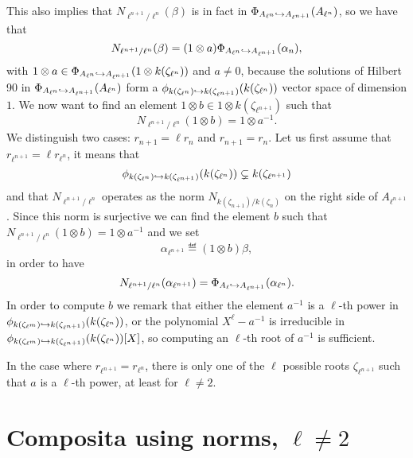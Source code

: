 \documentclass[a4paper,11pt]{article}
\begin{document}
This also implies that $N_{\ell^{n+1}/\ell^n}(\beta)$ is in fact in
$\Phi_{A_{\ell^n}\hookrightarrow A_{\ell^{n+1}}}(A_{\ell^n})$, so we have that
\[
  N_{\ell^{n+1}/\ell^n}(\beta) = (1\otimes a)\Phi_{A_{\ell^n}\hookrightarrow
  A_{\ell^{n+1}}}(\alpha_n),
\]
with $1\otimes a\in \Phi_{A_{\ell^n}\hookrightarrow A_{\ell^{n+1}}}(1\otimes
k(\zeta_{\ell^n}))$ and $a\neq0$, because the solutions of Hilbert 90 in
$\Phi_{A_{\ell^n}\hookrightarrow A_{\ell^{n+1}}}(A_{\ell^n})$
form a $\phi_{k(\zeta_{\ell^n})\hookrightarrow k(\zeta_{\ell^{n+1}})}(k(\zeta_{\ell^n}))$ vector space of dimension $1$. We now want to find an
element $1\otimes b\in1\otimes k(\zeta_{\ell^{n+1}})$ such that
\[
N_{\ell^{n+1}/\ell^n}(1\otimes b)=1\otimes a^{-1}.
\]
We distinguish two
cases: $r_{n+1}=\ell r_n$ and $r_{n+1}=r_n$.
Let us first assume that $r_{\ell^{n+1}}=\ell r_{\ell^n}$, it means that
\[
  \phi_{k(\zeta_{\ell^n})\hookrightarrow k(\zeta_{\ell^{n+1}})}(k(\zeta_{\ell^n}))\subsetneq
k(\zeta_{\ell^{n+1}})
\]
and that $N_{\ell^{n+1}/\ell^{n}}$ operates as the norm
$N_{k(\zeta_{n+1})/k(\zeta_n)}$ on the right side of $A_{\ell^{n+1}}$. Since this norm
is surjective we can find the  element $b$ such that $N_{\ell^{n+1}/\ell^n}(1\otimes b)=1\otimes a^{-1}$ and
we set 
\[
  \alpha_{\ell^{n+1}}\eqdef (1\otimes b)\beta,
\]
in order to have
\[
  N_{\ell^{n+1}/\ell^n}(\alpha_{\ell^{n+1}})=\Phi_{A_{\ell}\hookrightarrow
  A_{\ell^{n+1}}}(\alpha_{\ell^n}).
\]
In order to compute $b$ we remark that either the element
$a^{-1}$ is a $\ell$-th power in $\phi_{k(\zeta_{\ell^m})\hookrightarrow
k(\zeta_{\ell^{n+1}})}(k(\zeta_{\ell^n}))$, or the polynomial
$X^\ell-a^{-1}$ is irreducible in $\phi_{k(\zeta_{\ell^m})\hookrightarrow
k(\zeta_{\ell^{n+1}})}(k(\zeta_{\ell^n}))[X]$, so computing an $\ell$-th
root of $a^{-1}$ is sufficient.

In the case where $r_{\ell^{n+1}}=r_{\ell^n}$, there is only one of the $\ell$ possible roots
$\zeta_{\ell^{n+1}}$ such that $a$ is a $\ell$-th power, at least for $\ell\neq2$.

\section{Composita using norms, $\ell\neq2$}
\label{sec:comp-norm}
\end{document}
